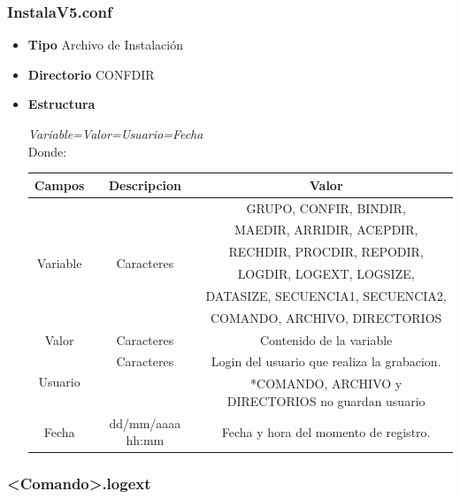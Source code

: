 \documentclass[a4paper,10pt,titlepage]{article}
\begin{document}
		\subsubsection{InstalaV5.conf}

			\begin {itemize}
				\item \textbf{Tipo} {Archivo de Instalaci\'on}
				\item \textbf{Directorio} {CONFDIR}
				\item \textbf{Estructura} {\textit{	Variable=Valor=Usuario=Fecha}\\
					Donde: \ 
					\begin{table}[H]
					\centering
					\begin{tabular}{| c | c | c |}
						\hline
						Campos 	& Descripcion & Valor \\
						\hline
						\multirow{6}{*}{Variable} & \multirow{6}{*}{Caracteres}	& GRUPO, CONFIR, BINDIR, \\
								{}			  & {}							 & MAEDIR, ARRIDIR, ACEPDIR, \\
								{}			& 	{}						& RECHDIR, PROCDIR, REPODIR, \\
								{}			& {}  							& LOGDIR, LOGEXT, LOGSIZE, \\
								{}			& 	{}						& DATASIZE, SECUENCIA1, SECUENCIA2, \\
								{}			& {} 							& COMANDO, ARCHIVO, DIRECTORIOS\\ 
						\hline 
						Valor 	& Caracteres 	& Contenido de la variable \\
						\hline
						\multirow{2}{*}{Usuario} & Caracteres & Login del usuario que realiza la grabacion. \\
											 &			&\small{ *COMANDO, ARCHIVO y DIRECTORIOS no guardan usuario}\\
						\hline
						Fecha	& dd/mm/aaaa hh:mm 	&	Fecha y hora del momento de registro. \\
						\hline
	
					\end{tabular}
					\end{table}
				}
			\end{itemize}
		
		\subsubsection{<Comando>.logext}
\end{document}
